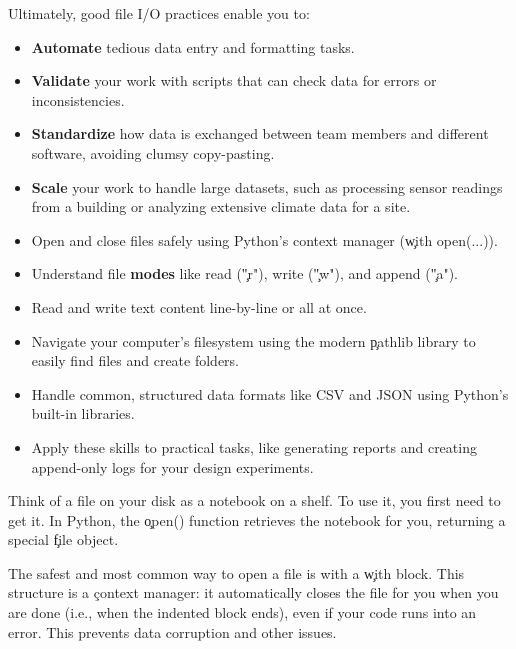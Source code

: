 Ultimately, good file I/O practices enable you to:
\begin{itemize}
  \item \textbf{Automate} tedious data entry and formatting tasks.
  \item \textbf{Validate} your work with scripts that can check data for errors or inconsistencies.
  \item \textbf{Standardize} how data is exchanged between team members and different software, avoiding clumsy copy-pasting.
  \item \textbf{Scale} your work to handle large datasets, such as processing sensor readings from a building or analyzing extensive climate data for a site.
\end{itemize}

\begin{tcolorbox}[
    title=Focus of this chapter,
    colframe=orange,
    colback=white,
    arc=2mm
  ]
  \begin{itemize}
    \item Open and close files safely using Python's context manager (\c{with open(...)}).
    \item Understand file \textbf{modes} like read (\c{"r"}), write (\c{"w"}), and append (\c{"a"}).
    \item Read and write text content line-by-line or all at once.
    \item Navigate your computer's filesystem using the modern \c{pathlib} library to easily find files and create folders.
    \item Handle common, structured data formats like CSV and JSON using Python's built-in libraries.
    \item Apply these skills to practical tasks, like generating reports and creating append-only logs for your design experiments.
  \end{itemize}
\end{tcolorbox}


Think of a file on your disk as a notebook on a shelf. To use it, you first need to get it. In Python, the \c{open()} function retrieves the notebook for you, returning a special \c{file object}.

The safest and most common way to open a file is with a \c{with} block. This structure is a \c{context manager}: it automatically closes the file for you when you are done (i.e., when the indented block ends), even if your code runs into an error. This prevents data corruption and other issues.

